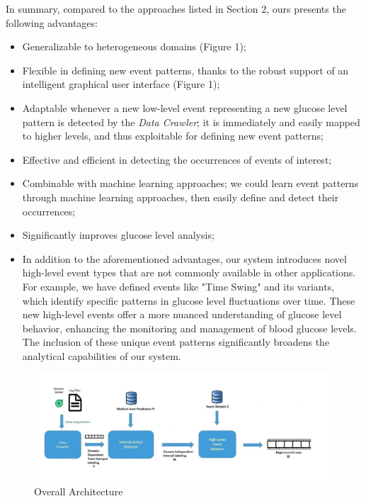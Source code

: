 \documentclass{article}
\begin{document}
In summary, compared to the approaches listed in Section 2, ours presents the following advantages:

\begin{itemize}
    \item Generalizable to heterogeneous domains (Figure 1);
    \item Flexible in defining new event patterns, thanks to the robust support of an intelligent graphical user interface (Figure 1);
    \item Adaptable whenever a new low-level event representing a new glucose level pattern is detected by the \textit{Data Crawler}; it is immediately and easily mapped to higher levels, and thus exploitable for defining new event patterns;
    \item Effective and efficient in detecting the occurrences of events of interest;
    \item Combinable with machine learning approaches; we could learn event patterns through machine learning approaches, then easily define and detect their occurrences;
    \item Significantly improves glucose level analysis;

    \item In addition to the aforementioned advantages, our system introduces novel high-level event types that are not commonly available in other applications. For example, we have defined events like "Time Swing" and its variants, which identify specific patterns in glucose level fluctuations over time. These new high-level events offer a more nuanced understanding of glucose level behavior, enhancing the monitoring and management of blood glucose levels. The inclusion of these unique event patterns significantly broadens the analytical capabilities of our system.
\end{itemize}

\begin{figure}[h]
    \centering
    \includegraphics[width=1.0\textwidth]{Images/architecture.png}
    \caption{Overall Architecture}
    \label{fig:architecture}
\end{figure}
\end{document}
